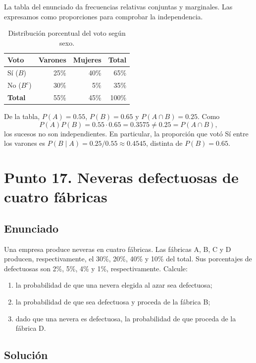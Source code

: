 \documentclass[12pt]{article}
\begin{document}
La tabla del enunciado da frecuencias relativas conjuntas y marginales. Las expresamos como proporciones para comprobar la independencia.

\begin{table}[H]
\centering
\small
\renewcommand{\arraystretch}{1.15}
\begin{tabular}{|l|r|r|r|}
\hline
\textbf{Voto} & \textbf{Varones} & \textbf{Mujeres} & \textbf{Total} \\ \hline
Sí ($B$) & 25\% & 40\% & 65\% \\ \hline
No ($B^c$) & 30\% & 5\% & 35\% \\ \hline
\textbf{Total} & 55\% & 45\% & 100\% \\ \hline
\end{tabular}
\caption{Distribución porcentual del voto según sexo.}
\label{tab:voto-sexo}
\end{table}

De la tabla, $P(A)=0.55$, $P(B)=0.65$ y $P(A\cap B)=0.25$. Como
\[
P(A)P(B)=0.55\cdot0.65=0.3575\neq0.25=P(A\cap B),
\]
los sucesos no son independientes. En particular, la proporción que votó Sí entre los varones es $P(B\mid A)=0.25/0.55\approx0.4545$, distinta de $P(B)=0.65$.

\section*{Punto 17. Neveras defectuosas de cuatro fábricas}

\subsection*{Enunciado}

Una empresa produce neveras en cuatro fábricas. Las fábricas A, B, C y D producen, respectivamente, el 30\%, 20\%, 40\% y 10\% del total. Sus porcentajes de defectuosas son 2\%, 5\%, 4\% y 1\%, respectivamente. Calcule:

\begin{enumerate}
    \item la probabilidad de que una nevera elegida al azar sea defectuosa;
    \item la probabilidad de que sea defectuosa y proceda de la fábrica B;
    \item dado que una nevera es defectuosa, la probabilidad de que proceda de la fábrica D.
\end{enumerate}

\subsection*{Solución}
\end{document}
